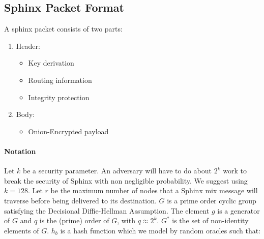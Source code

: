 \subsection{Sphinx Packet Format}

A sphinx packet consists of two parts:
\begin{enumerate}
\item Header:
\begin{itemize}
\item Key derivation
\item Routing information
\item Integrity protection
\end{itemize}
\item Body:
\begin{itemize}
\item Onion-Encrypted payload
\end{itemize}
\end{enumerate}
\paragraph{Notation}
Let $k$ be a security parameter. An adversary will have to do about $2^k$ work to break the security of Sphinx with non negligible probability. We suggest using $k=128$.
Let $r$ be the maximum number of nodes that a Sphinx mix message will traverse before being delivered to its destination.
$G$ is a prime order cyclic group satisfying the Decisional Diffie-Hellman Assumption. The element $g$ is a generator of $G$ and $q$ is the (prime) order of $G$, with $q\approx 2^k$.
$G^*$ is the set of non-identity elements of $G$.
$h_b$ is a hash function which we model by random oracles such that:



